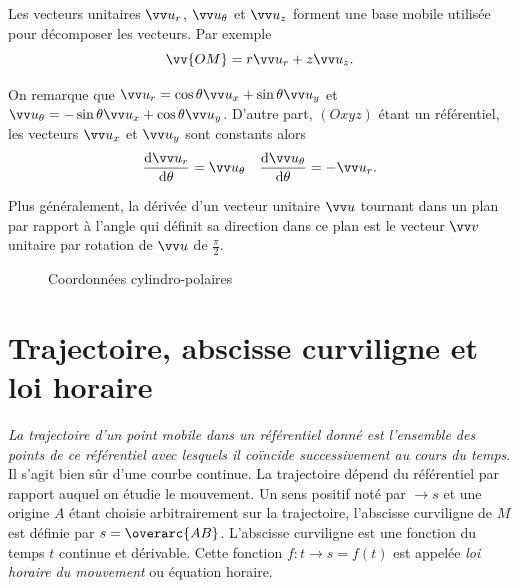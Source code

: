 Les vecteurs unitaires $\ur$, $\utheta$ et $\uz$ forment une base mobile utilisée pour décomposer les vecteurs. Par exemple
\begin{equation}
  \vv{OM}=r \ur + z\uz.
\end{equation}

On remarque que $\ur = \cos \theta \ux + \sin \theta \uy$ et $\utheta = -\sin \theta \ux + \cos \theta \uy$. D'autre part, $(Oxyz)$ étant un référentiel, les vecteurs $\ux$ et $\uy$ sont constants alors
\begin{equation}
  \derived{\ur}{\theta} = \utheta \quad \derived{\utheta}{\theta} = -\ur.
\end{equation}

Plus généralement, la dérivée d'un vecteur unitaire $\vu$ tournant dans un plan par rapport à l'angle qui définit sa direction dans ce plan est le vecteur $\vvv$ unitaire par rotation de $\vu$ de $\frac{\pi}{2}$.

 \begin{figure}
   \centering
   \caption{Coordonnées cylindro-polaires}
   \label{fig:coordonnees}
 \end{figure}

\section{Trajectoire, abscisse curviligne et loi horaire}
\label{chap1-sec:trajectoireabcissecurv}

\emph{La trajectoire d'un point mobile dans un référentiel donné est l'ensemble des points de ce référentiel avec lesquels il coïncide successivement au cours du temps}. Il s'agit bien sûr d'une courbe continue. La trajectoire dépend du référentiel par rapport auquel on étudie le mouvement. Un sens positif noté par $\rightarrow s$ et une origine $A$ étant choisie arbitrairement sur la trajectoire, l'abscisse curviligne de $M$ est définie par $s=\overarc{AB}$. L'abscisse curviligne est une fonction du temps $t$ continue et dérivable. Cette fonction $f:t \rightarrow s=f(t)$ est appelée \emph{loi horaire du mouvement} ou équation horaire.

